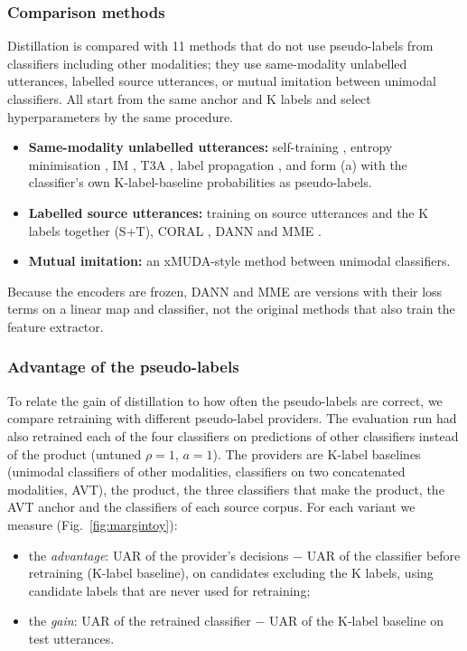 \subsubsection{Comparison methods}\label{sec:compmethods}
Distillation is compared with 11 methods that do not use pseudo-labels from classifiers including other modalities; they use same-modality unlabelled utterances, labelled source utterances, or mutual imitation between unimodal classifiers. All start from the same anchor and K labels and select hyperparameters by the same procedure.
\begin{itemize}
\item \textbf{Same-modality unlabelled utterances:} self-training \cite{lee2013pseudolabel}, entropy minimisation \cite{grandvalet2004}, IM \cite{liang2020,boudiaf2020}, T3A \cite{iwasawa2021}, label propagation \cite{zhou2004,iscen2019}, and form (a) with the classifier's own K-label-baseline probabilities as pseudo-labels.
\item \textbf{Labelled source utterances:} training on source utterances and the K labels together (S+T), CORAL \cite{sun2016coral}, DANN \cite{ganin2016dann} and MME \cite{saito2019mme}.
\item \textbf{Mutual imitation:} an xMUDA-style method \cite{jaritz2020xmuda} between unimodal classifiers.
\end{itemize}
Because the encoders are frozen, DANN and MME are versions with their loss terms on a linear map and classifier, not the original methods that also train the feature extractor.

\subsubsection{Advantage of the pseudo-labels}\label{sec:margin}
To relate the gain of distillation to how often the pseudo-labels are correct, we compare retraining with different pseudo-label providers. The evaluation run had also retrained each of the four classifiers on predictions of other classifiers instead of the product (untuned $\rho=1$, $a=1$). The providers are K-label baselines (unimodal classifiers of other modalities, classifiers on two concatenated modalities, AVT), the product, the three classifiers that make the product, the AVT anchor and the classifiers of each source corpus. For each variant we measure (Fig.~\ref{fig:margintoy}):
\begin{itemize}
\item the \emph{advantage}: UAR of the provider's decisions $-$ UAR of the classifier before retraining (K-label baseline), on candidates excluding the K labels, using candidate labels that are never used for retraining;
\item the \emph{gain}: UAR of the retrained classifier $-$ UAR of the K-label baseline on test utterances.
\end{itemize}

